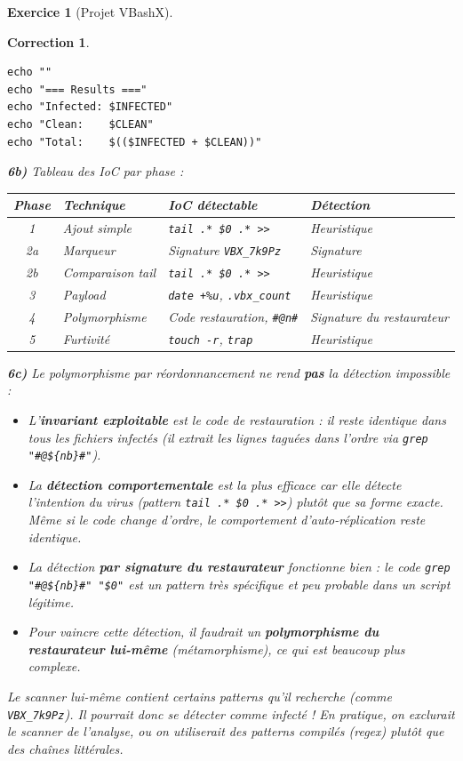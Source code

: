 \documentclass[a4paper,11pt]{article}
\theoremstyle{plain}
\newtheorem{correction}{Correction}
\theoremstyle{definition}
\newtheorem{exercice}{Exercice}
\begin{document}
\begin{exercice}[Projet VBashX]
\begin{correction}
\begin{lstlisting}[title=scanner.sh]
echo ""
echo "=== Results ==="
echo "Infected: $INFECTED"
echo "Clean:    $CLEAN"
echo "Total:    $(($INFECTED + $CLEAN))"
\end{lstlisting}

\textbf{6b)} Tableau des IoC par phase :
\begin{center}
\begin{tabular}{clll}
\toprule
\textbf{Phase} & \textbf{Technique} & \textbf{IoC détectable} & \textbf{Détection} \\
\midrule
1 & Ajout simple & \texttt{tail .* \$0 .* >>} & Heuristique \\
2a & Marqueur & Signature \texttt{VBX\_7k9Pz} & Signature \\
2b & Comparaison tail & \texttt{tail .* \$0 .* >>} & Heuristique \\
3 & Payload & \texttt{date +\%u}, \texttt{.vbx\_count} & Heuristique \\
4 & Polymorphisme & Code restauration, \texttt{\#@n\#} & Signature du restaurateur \\
5 & Furtivité & \texttt{touch -r}, \texttt{trap} & Heuristique \\
\bottomrule
\end{tabular}
\end{center}

\textbf{6c)} Le polymorphisme par réordonnancement ne rend \textbf{pas} la détection impossible :
\begin{itemize}
    \item L'\textbf{invariant exploitable} est le code de restauration : il reste identique dans tous les fichiers infectés (il extrait les lignes taguées dans l'ordre via \texttt{grep "\#@\$\{nb\}\#"}).
    \item La \textbf{détection comportementale} est la plus efficace car elle détecte l'\textit{intention} du virus (pattern \texttt{tail .* \$0 .* >>}) plutôt que sa forme exacte. Même si le code change d'ordre, le comportement d'auto-réplication reste identique.
    \item La détection \textbf{par signature du restaurateur} fonctionne bien : le code \texttt{grep "\#@\$\{nb\}\#" "\$0"} est un pattern très spécifique et peu probable dans un script légitime.
    \item Pour vaincre cette détection, il faudrait un \textbf{polymorphisme du restaurateur lui-même} (métamorphisme), ce qui est beaucoup plus complexe.
\end{itemize}

\begin{attention}
Le scanner lui-même contient certains patterns qu'il recherche (comme \texttt{VBX\_7k9Pz}). Il pourrait donc se détecter comme infecté ! En pratique, on exclurait le scanner de l'analyse, ou on utiliserait des patterns compilés (regex) plutôt que des chaînes littérales.
\end{attention}


\end{correction}
\end{exercice}
\end{document}
